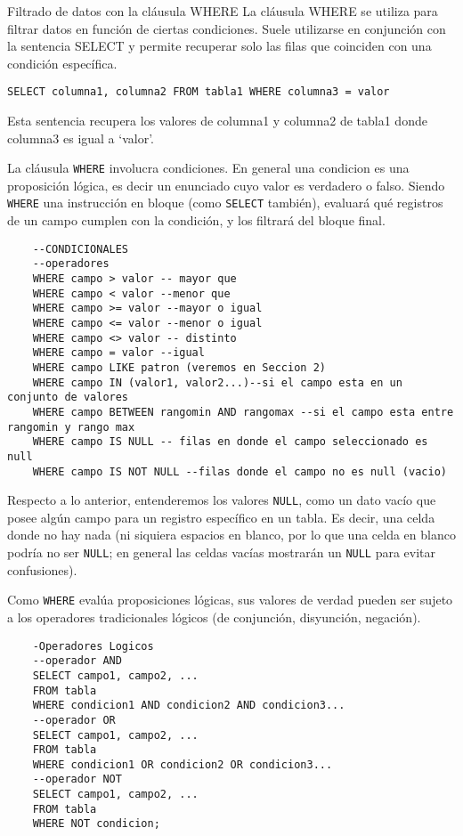 \begin{frame}[fragile]{Filtrado de datos con la cláusula WHERE}
\protect\hypertarget{filtrado-de-datos-con-la-cluxe1usula-where}{}
La cláusula WHERE se utiliza para filtrar datos en función de ciertas
condiciones. Suele utilizarse en conjunción con la sentencia SELECT y
permite recuperar solo las filas que coinciden con una condición
específica.

\texttt{SELECT\ columna1,\ columna2\ FROM\ tabla1\ WHERE\ columna3\ =\ \textquotesingle{}valor\textquotesingle{}}

Esta sentencia recupera los valores de columna1 y columna2 de tabla1
donde columna3 es igual a `valor'.

La cláusula \texttt{WHERE} involucra condiciones. En general una
condicion es una proposición lógica, es decir un enunciado cuyo valor es
verdadero o falso. Siendo \texttt{WHERE} una instrucción en bloque (como
\texttt{SELECT} también), evaluará qué registros de un campo cumplen con
la condición, y los filtrará del bloque final.

\begin{verbatim}
    --CONDICIONALES
    --operadores
    WHERE campo > valor -- mayor que
    WHERE campo < valor --menor que
    WHERE campo >= valor --mayor o igual
    WHERE campo <= valor --menor o igual
    WHERE campo <> valor -- distinto
    WHERE campo = valor --igual
    WHERE campo LIKE patron (veremos en Seccion 2)
    WHERE campo IN (valor1, valor2...)--si el campo esta en un conjunto de valores
    WHERE campo BETWEEN rangomin AND rangomax --si el campo esta entre rangomin y rango max
    WHERE campo IS NULL -- filas en donde el campo seleccionado es null
    WHERE campo IS NOT NULL --filas donde el campo no es null (vacio)
\end{verbatim}

Respecto a lo anterior, entenderemos los valores \texttt{NULL}, como un
dato vacío que posee algún campo para un registro específico en un
tabla. Es decir, una celda donde no hay nada (ni siquiera espacios en
blanco, por lo que una celda en blanco podría no ser \texttt{NULL}; en
general las celdas vacías mostrarán un \texttt{NULL} para evitar
confusiones).

Como \texttt{WHERE} evalúa proposiciones lógicas, sus valores de verdad
pueden ser sujeto a los operadores tradicionales lógicos (de conjunción,
disyunción, negación).

\begin{verbatim}
    -Operadores Logicos
    --operador AND
    SELECT campo1, campo2, ...
    FROM tabla
    WHERE condicion1 AND condicion2 AND condicion3...
    --operador OR
    SELECT campo1, campo2, ...
    FROM tabla
    WHERE condicion1 OR condicion2 OR condicion3...
    --operador NOT
    SELECT campo1, campo2, ...
    FROM tabla
    WHERE NOT condicion;
\end{verbatim}
\end{frame}

